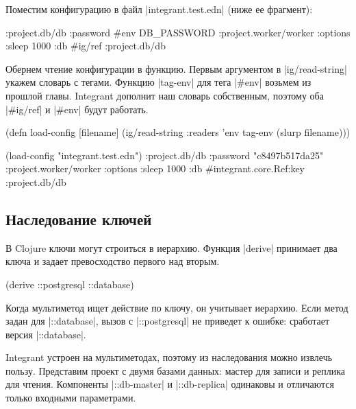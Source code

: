 Поместим конфигурацию в файл \spverb|integrant.test.edn| (ниже ее фрагмент):

\begin{english}
  \begin{clojure}
{:project.db/db {:password #env DB_PASSWORD}
 :project.worker/worker {:options {:sleep 1000}
                         :db #ig/ref :project.db/db}}
  \end{clojure}
\end{english}

Обернем чтение конфигурации в функцию. Первым аргументом в
\spverb|ig/read-string| укажем словарь с тегами. Функцию \spverb|tag-env| для
тега \spverb|#env| возьмем из прошлой главы. Integrant дополнит наш словарь
собственным, поэтому оба \spverb|#ig/ref| и \spverb|#env| будут работать.

\begin{english}
  \begin{clojure}
(defn load-config [filename]
  (ig/read-string {:readers {'env tag-env}}
                  (slurp filename)))

(load-config "integrant.test.edn")
{:project.db/db {:password "c8497b517da25"}
 :project.worker/worker
 {:options {:sleep 1000}
  :db #integrant.core.Ref{:key :project.db/db}}}
  \end{clojure}
\end{english}

\subsection{Наследование ключей}

В Clojure ключи могут строиться в иерархию. Функция \spverb|derive| принимает
два ключа и задает превосходство первого над вторым.

\begin{english}
  \begin{clojure}
(derive ::postgresql ::database)
  \end{clojure}
\end{english}

Когда мультиметод ищет действие по ключу, он учитывает иерархию. Если метод
задан для \spverb|::database|, вызов с \spverb|::postgresql| не приведет к
ошибке: сработает версия \spverb|::database|.

Integrant устроен на мультиметодах, поэтому из наследования можно извлечь
пользу. Представим проект с двумя базами данных: мастер для записи и реплика для
чтения. Компоненты \spverb|::db-master| и \spverb|::db-replica| одинаковы и
отличаются только входными параметрами.

